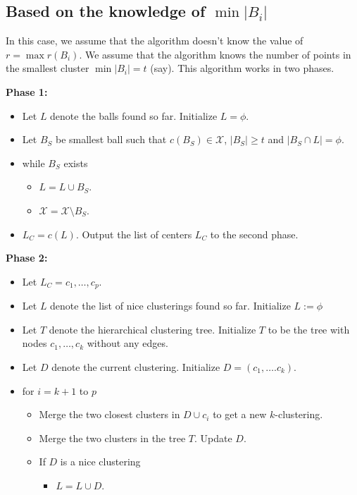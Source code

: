 \documentclass[11pt]{article}
\newenvironment{alg}{
    \begin{list}{}{
        \setlength{\itemsep}{2pt}
        \setlength{\parsep}{0pt}
        \setlength{\parskip}{0pt}
        \setlength{\topsep}{1pt}
    }
}
{
    \end{list}
}
\begin{document}
\subsection{Based on the knowledge of $\min |B_i|$}
In this case, we assume that the algorithm doesn't know the value of $r = \max r(B_i)$. We assume that the algorithm knows the number of points in the smallest cluster $\min |B_i| = t$ (say). This algorithm works in two phases.

\begin{algorithm}
\begin{alg}
\item[] \textbf{Phase 1:}
\begin{itemize}
\item[] Let $L$ denote the balls found so far. Initialize $L = \phi$.
\item[] Let $B_S$ be smallest ball such that $c(B_S) \in \mathcal{X}$, $|B_S| \ge t$  and $|B_S \cap L | = \phi$.
\item[] while $B_S$ exists
\begin{itemize}
\item[] $L = L \cup B_S$. 
\item[] $\mathcal{X} = \mathcal{X}\setminus B_S$.
\end{itemize}
\item[] $L_C = c(L)$. Output the list of centers $L_C$ to the second phase.
\end{itemize}

\item[] \textbf{Phase 2:}
\begin{itemize}
\item[] Let $L_C = c_1,\ldots,c_p$.
\item[] Let $L$ denote the list of nice clusterings found so far. Initialize $L := \phi$
\item[] Let $T$ denote the hierarchical clustering tree. Initialize $T$ to be the tree with nodes $c_1,\ldots,c_k$ without any edges.
\item[] Let $D$ denote the current clustering. Initialize $D = (c_1,\ldots.c_k)$.
\item[] for $i=k+1$ to $p$
\begin{itemize}
\item[] Merge the two closest clusters in $D\cup c_i$ to get a new $k$-clustering. 
\item[] Merge the two clusters in the tree $T$. Update $D$. 
\item[] If $D$ is a nice clustering
\begin{itemize}
\item[] $L = L \cup D$.
\end{itemize}
\end{itemize}


\end{itemize}
\end{alg}
\end{algorithm}
\end{document}
